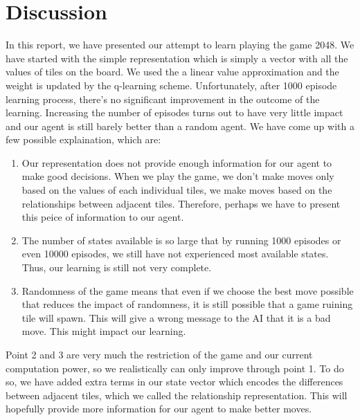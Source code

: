 \section{Discussion}
In this report, we have presented our attempt to learn playing the game 2048. We have started with the simple representation which is simply a vector with all the values of tiles on the board. We used the a linear value approximation and the weight is updated by the q-learning scheme. Unfortunately, after 1000 episode learning process, there's no significant improvement in the outcome of the learning. Increasing the number of episodes turns out to have very little impact and our agent is still barely better than a random agent. We have come up with a few possible explaination, which are:
\\
\begin{enumerate}
	\item Our representation does not provide enough information for our agent to make good decisions. When we play the game, we don't make moves only based on the values of each individual tiles, we make moves based on the relationships between adjacent tiles. Therefore, perhaps we have to present this peice of information to our agent.
	\item The number of states available is so large that by running 1000 episodes or even 10000 episodes, we still have not experienced most available states. Thus, our learning is still not very complete.
	\item Randomness of the game means that even if we choose the best move possible that reduces the impact of randomness,  it is still possible that a game ruining tile will spawn. This will give a wrong message to  the AI that it is a bad move. This might impact our learning.
\end{enumerate}


Point 2 and 3 are very much the restriction of the game and our current computation power, so we realistically can only improve through point 1. To do so, we have added extra terms in our state vector which  encodes the differences between adjacent tiles, which we called the relationship representation. This will hopefully provide more information for our agent to make better moves.
